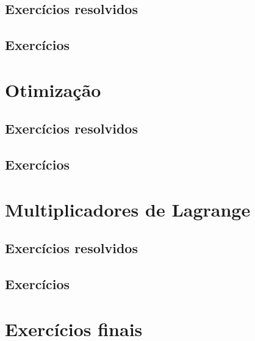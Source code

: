 \subsection*{Exercícios resolvidos}
\construirExeresol

\subsection*{Exercícios}
\construirExer


\section{Otimização}

\subsection*{Exercícios resolvidos}
\construirExeresol

\subsection*{Exercícios}
\construirExer

\section{Multiplicadores de Lagrange}

\subsection*{Exercícios resolvidos}
\construirExeresol

\subsection*{Exercícios}
\construirExer

\section{Exercícios finais}
\construirExer

